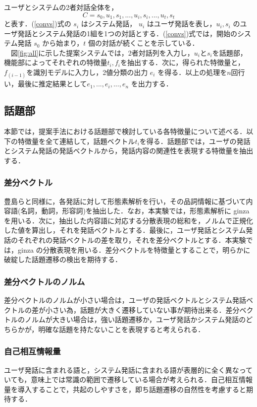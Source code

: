 \documentclass[upLaTex, 10pt,dvipdfmx,a4paper,twocolumn]{jsarticle}
\begin{document}
    ユーザとシステムの2者対話全体を，
    \begin{equation}
    \label{convs}
        C = s_0, u_1, s_1, ..., u_i, s_i, ..., u_t, s_t
    \end{equation}
    と表す．(\ref{convs})式の $s_i$ はシステム発話， $u_i$ はユーザ発話を表し，$u_i, s_i$ のユーザ発話とシステム発話の1組を1つの対話とする．(\ref{convs})式では，開始のシステム発話 $s_0$ から始まり，$t$ 個の対話が続くことを示している．\\
    　図\ref{fig:all}に示した提案システムでは，2者対話列を入力し，$u_i$と$s_i$を話題部，機能部によってそれぞれの特徴量$t_i, f_i$を抽出する．次に，得られた特徴量と，$f_(i-1)$を識別モデルに入力し，2値分類の出力 $e_i$ を得る．以上の処理を$n$回行い，最後に推定結果として$e_1, ..., e_i, ..., e_n$ を出力する．

    \subsection{話題部}
    本節では，提案手法における話題部で検討している各特徴量について述べる．以下の特徴量を全て連結して，話題ベクトル$t_i$を得る．話題部では，ユーザの発話とシステム発話の発話ベクトルから，発話内容の関連性を表現する特徴量を抽出する．
    \subsubsection{差分ベクトル}
        豊島\cite{toyoshima}らと同様に，各発話に対して形態素解析を行い，その品詞情報に基づいて内容語(名詞，動詞，形容詞)を抽出した．なお，本実験では，形態素解析に ginza を用いる．次に，抽出した内容語に対応する分散表現の総和を，ノルムで正規化した値を算出し，それを発話ベクトルとする．最後に，ユーザ発話とシステム発話のそれぞれの発話ベクトルの差を取り，それを差分ベクトルとする．本実験では，ginza の分散表現を用いる．差分ベクトルを特徴量とすることで，明らかに破綻した話題遷移の検出を期待する．
    \subsubsection{差分ベクトルのノルム}
        差分ベクトルのノルムが小さい場合は，ユーザの発話ベクトルとシステム発話ベクトルの差が小さい為，話題が大きく遷移していない事が期待出来る．差分ベクトルのノルムが大きい場合は，強い話題遷移か，ユーザ発話かシステム発話のどちらかが，明確な話題を持たないことを表現すると考えられる．
    \subsubsection{自己相互情報量}
        ユーザ発話に含まれる語と，システム発話に含まれる語が表層的に全く異なっていても，意味上では常識の範囲で遷移している場合が考えられる．自己相互情報量を導入することで，共起のしやすさを，即ち話題遷移の自然性を考慮すると期待する．
    　
\end{document}
